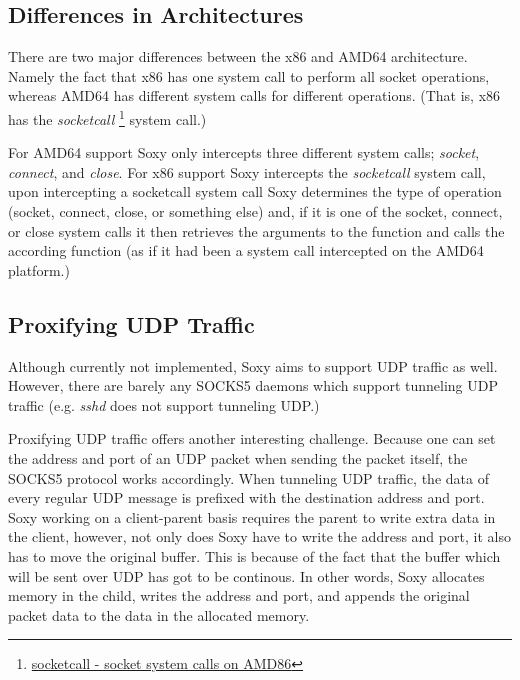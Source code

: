 \documentclass[a4paper, 10pt]{report}
\begin{document}
\subsection{Differences in Architectures}
\label{soxy-arch-diff}

There are two major differences between the x86 and AMD64 architecture. Namely
the fact that x86 has one system call to perform all socket operations,
whereas AMD64 has different system calls for different operations.
(That is, x86 has the \textit{socketcall}
\footnote{\href{http://linux.die.net/man/2/socketcall}{socketcall - socket
system calls on AMD86}} system call.)

For AMD64 support Soxy only intercepts three different system calls;
\textit{socket}, \textit{connect}, and \textit{close}. For x86 support Soxy
intercepts the \textit{socketcall} system call, upon intercepting a
socketcall system call Soxy determines the type of operation (socket, connect,
close, or something else) and, if it is one of the socket, connect, or close
system calls it then retrieves the arguments to the function and calls the
according function (as if it had been a system call intercepted on the AMD64 
platform.)


\subsection{Proxifying UDP Traffic}

Although currently not implemented, Soxy aims to support UDP traffic as well.
However, there are barely any SOCKS5 daemons which support tunneling UDP
traffic (e.g. \textit{sshd} does not support tunneling UDP.)

Proxifying UDP traffic offers another interesting challenge. Because one can
set the address and port of an UDP packet when sending the packet itself, the
SOCKS5 protocol works accordingly. When tunneling UDP traffic, the data of
every regular UDP message is prefixed with the destination address and port.
Soxy working on a client-parent basis requires the parent to write extra data
in the client, however, not only does Soxy have to write the address and port,
it also has to move the original buffer. This is because of the fact that the
buffer which will be sent over UDP has got to be continous. In other words,
Soxy allocates memory in the child, writes the address and port, and appends
the original packet data to the data in the allocated memory.
\end{document}
